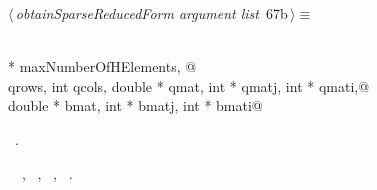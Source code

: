 \documentclass{article}
\begin{document}
\begin{flushleft} \small
\begin{minipage}{\linewidth}\label{scrap104}\raggedright\small
{} $\langle\,${\itshape obtainSparseReducedForm argument list}\nobreak\ {\footnotesize {67b}}$\,\rangle\equiv$
\vspace{-1ex}
\begin{list}{}{} \item
\mbox{}\verb@@\\
\mbox{}\verb@int * maxNumberOfHElements, @\\
\mbox{}\verb@int qrows, int qcols, double * qmat, int * qmatj, int * qmati,@\\
\mbox{}\verb@ double * bmat, int * bmatj, int * bmati@\\
\mbox{}\verb@@{\NWsep}
\end{list}
\vspace{-1.5ex}
\footnotesize
\begin{list}{}{\setlength{\itemsep}{-\parsep}\setlength{\itemindent}{-\leftmargin}}
\item \NWtxtMacroRefIn\ .
\item \NWtxtIdentsUsed\nobreak\  \verb@maxNumberOfHElements@\nobreak\ , \verb@qmat@\nobreak\ , \verb@qmati@\nobreak\ , \verb@qmatj@\nobreak\ .
\item{}
\end{list}
\end{minipage}\vspace{4ex}
\end{flushleft}
\end{document}
